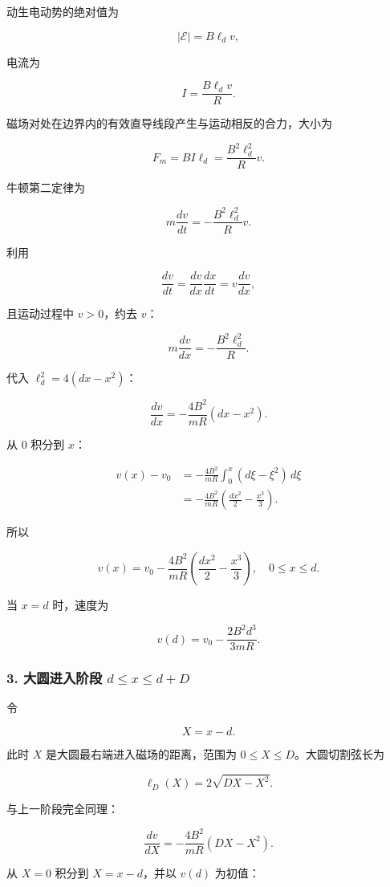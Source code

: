 \documentclass[12pt,a4paper,UTF8]{ctexart}
\begin{document}
动生电动势的绝对值为

\[
|\mathcal E|=B\ell_d v,
\]

电流为

\[
I=\frac{B\ell_d v}{R}.
\]

磁场对处在边界内的有效直导线段产生与运动相反的合力，大小为

\[
F_m=B I\ell_d
=\frac{B^2\ell_d^2}{R}v.
\]

牛顿第二定律为

\[
m\frac{dv}{dt}=-\frac{B^2\ell_d^2}{R}v.
\]

利用

\[
\frac{dv}{dt}=\frac{dv}{dx}\frac{dx}{dt}=v\frac{dv}{dx},
\]

且运动过程中 \(v>0\)，约去 \(v\)：

\[
m\frac{dv}{dx}=-\frac{B^2\ell_d^2}{R}.
\]

代入 \(\ell_d^2=4(dx-x^2)\)：

\[
\frac{dv}{dx}=-\frac{4B^2}{mR}(dx-x^2).
\]

从 \(0\) 积分到 \(x\)：

\[
\begin{aligned}
v(x)-v_0
&=-\frac{4B^2}{mR}\int_0^x(d\xi-\xi^2)\,d\xi\\
&=-\frac{4B^2}{mR}
\left(\frac{d x^2}{2}-\frac{x^3}{3}\right).
\end{aligned}
\]

所以

\[
\boxed{
v(x)=v_0-\frac{4B^2}{mR}
\left(\frac{d x^2}{2}-\frac{x^3}{3}\right),
\quad 0\le x\le d
}.
\]

当 \(x=d\) 时，速度为

\[
v(d)=v_0-\frac{2B^2d^3}{3mR}.
\]

\subsubsection{\texorpdfstring{3. 大圆进入阶段
\(d\le x\le d+D\)}{3. 大圆进入阶段 d\textbackslash le x\textbackslash le d+D}}\label{ux5927ux5706ux8fdbux5165ux9636ux6bb5-dle-xle-dd}

令

\[
X=x-d.
\]

此时 \(X\) 是大圆最右端进入磁场的距离，范围为
\(0\le X\le D\)。大圆切割弦长为

\[
\ell_D(X)=2\sqrt{DX-X^2}.
\]

与上一阶段完全同理：

\[
\frac{dv}{dX}=-\frac{4B^2}{mR}(DX-X^2).
\]

从 \(X=0\) 积分到 \(X=x-d\)，并以 \(v(d)\) 为初值：
\end{document}

